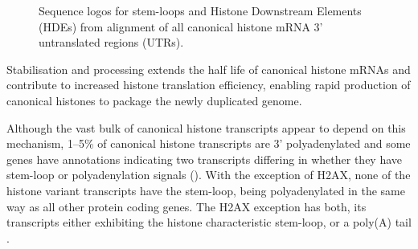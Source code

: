   \begin{figure}
    \centering
    \hfill
    \caption{%
      Sequence logos for stem-loops and Histone Downstream Elements (HDEs)
      from alignment of all canonical histone mRNA 3' untranslated
      regions (UTRs).
    }
  \end{figure}

  Stabilisation and processing extends the half life of canonical histone mRNAs
  and contribute to increased histone translation efficiency,
  enabling rapid production of canonical histones to package the newly duplicated genome.

  Although the vast bulk of canonical histone transcripts appear to depend on this mechanism,
  1--5\% of canonical histone transcripts are 3' polyadenylated \citep{YangGenomeBiol2011}
  and some genes have annotations indicating two transcripts
  differing in whether they have stem-loop or polyadenylation
  signals ().
  With the exception of H2AX, none of the histone variant transcripts have the
  stem-loop, being polyadenylated in the same way as all other protein coding genes.
  The H2AX exception has both, its transcripts either exhibiting the histone
  characteristic stem-loop, or a poly(A) tail \citep{HTwoAX-transcripts,our-H2AX-review}.
